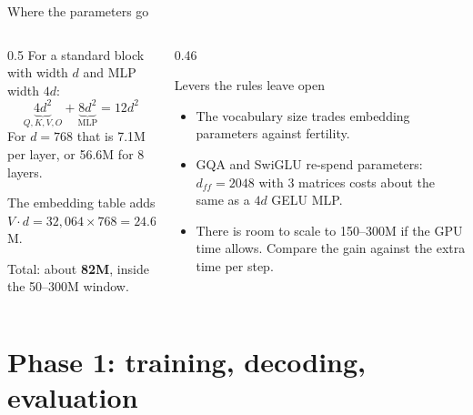 \documentclass[aspectratio=169,11pt]{beamer}
\begin{document}
\begin{frame}{Where the parameters go}
  \begin{columns}[T]
    \begin{column}{0.5\textwidth}
      \small
      For a standard block with width $d$ and MLP width $4d$:
      \[
        \underbrace{4d^2}_{Q,K,V,O} + \underbrace{8d^2}_{\text{MLP}} = 12d^2
      \]
      For $d=768$ that is 7.1M per layer, or 56.6M for 8 layers.
      \vspace{1mm}

      The embedding table adds $V\cdot d = 32{,}064\times768 = 24.6$M.
      \vspace{1mm}

      Total: about \textbf{82M}, inside the 50--300M window.
    \end{column}
    \begin{column}{0.46\textwidth}
      \begin{block}{Levers the rules leave open}
        \small
        \begin{itemize}
          \item The vocabulary size trades embedding parameters against fertility.
          \item GQA and SwiGLU re-spend parameters: $d_{ff}=2048$ with 3 matrices costs about the same as a $4d$ GELU MLP.
          \item There is room to scale to 150--300M if the GPU time allows. Compare the gain against the extra time per step.
        \end{itemize}
      \end{block}
    \end{column}
  \end{columns}
\end{frame}

\section{Phase 1: training, decoding, evaluation}
\end{document}
